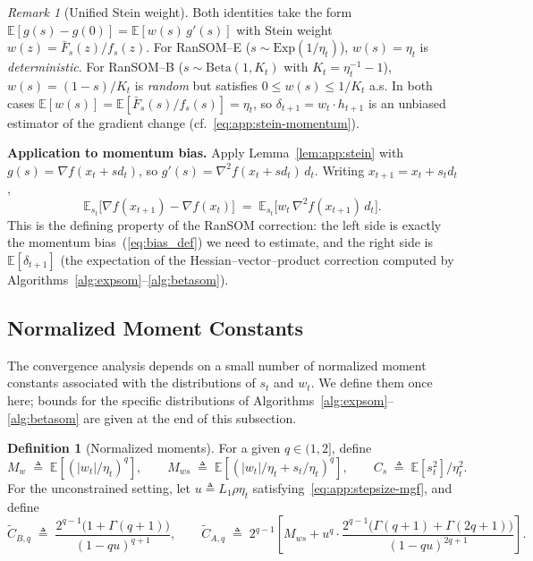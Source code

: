\documentclass{article}
\theoremstyle{plain}
\theoremstyle{definition}
\newtheorem{definition}[theorem]{Definition}
\theoremstyle{remark}
\newtheorem{remark}[theorem]{Remark}
\begin{document}
\begin{remark}[Unified Stein weight]
\label{rem:app:stein-weight}
Both identities take the form $\mathbb{E}[g(s) - g(0)] =
\mathbb{E}[w(s)\, g'(s)]$ with Stein weight $w(z) = \bar
F_s(z)/f_s(z)$. For RanSOM--E ($s \sim \mathrm{Exp}(1/\eta_t)$), $w(s) =
\eta_t$ is \emph{deterministic}. For RanSOM--B ($s \sim
\mathrm{Beta}(1, K_t)$ with $K_t = \eta_t^{-1} - 1$), $w(s) = (1-s)/K_t$
is \emph{random} but satisfies $0 \leq w(s) \leq 1/K_t$ a.s. In both
cases $\mathbb{E}[w(s)] = \mathbb{E}[\bar F_s(s)/f_s(s)] = \eta_t$, so
$\delta_{t+1} = w_t \cdot h_{t+1}$ is an unbiased estimator of the
gradient change (cf.~\eqref{eq:app:stein-momentum}).
\end{remark}

\smallskip\noindent\textbf{Application to momentum bias.}
Apply Lemma~\ref{lem:app:stein} with $g(s) = \nabla f(x_t + s d_t)$, so
$g'(s) = \nabla^2 f(x_t + s d_t)\, d_t$. Writing $x_{t+1} = x_t + s_t
d_t$,
\begin{equation}
  \mathbb{E}_{s_t}\bigl[\nabla f(x_{t+1}) - \nabla f(x_t)\bigr]
  \;=\; \mathbb{E}_{s_t}\bigl[w_t\, \nabla^2 f(x_{t+1})\, d_t\bigr].
  \label{eq:app:stein-momentum}
\end{equation}
This is the defining property of the RanSOM correction: the left side is
exactly the momentum bias~(\ref{eq:bias_def}) we need to estimate, and
the right side is $\mathbb{E}[\delta_{t+1}]$ (the expectation of the
Hessian--vector--product correction computed by
Algorithms~\ref{alg:expsom}--\ref{alg:betasom}).

\subsection{Normalized Moment Constants}
\label{app:constants}

The convergence analysis depends on a small number of normalized moment
constants associated with the distributions of $s_t$ and $w_t$. We
define them once here; bounds for the specific distributions of
Algorithms~\ref{alg:expsom}--\ref{alg:betasom} are given at the end of
this subsection.

\begin{definition}[Normalized moments]
\label{def:app:moments}
For a given $q \in (1, 2]$, define
\begin{equation}
  M_w \;\triangleq\; \mathbb{E}\!\left[(|w_t|/\eta_t)^q\right],
  \qquad
  M_{ws} \;\triangleq\; \mathbb{E}\!\left[(|w_t|/\eta_t + s_t/\eta_t)^q\right],
  \qquad
  C_s \;\triangleq\; \mathbb{E}[s_t^2]/\eta_t^2.
  \label{eq:app:moments}
\end{equation}
For the unconstrained setting, let $u \triangleq L_1 \rho \eta_t$
satisfying~\eqref{eq:app:stepsize-mgf}, and define
\begin{equation}
  \widetilde C_{B,q} \;\triangleq\;
    \frac{2^{q-1}\bigl(1 + \Gamma(q+1)\bigr)}{(1 - qu)^{q+1}},
  \qquad
  \widetilde C_{A,q} \;\triangleq\;
    2^{q-1}\!\left[M_{ws} +
      u^q\cdot\frac{2^{q-1}\bigl(\Gamma(q+1) + \Gamma(2q+1)\bigr)}
        {(1 - qu)^{2q+1}}\right].
  \label{eq:app:CAB}
\end{equation}
\end{definition}
\end{document}
